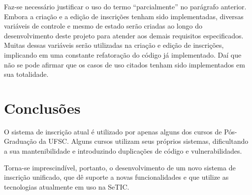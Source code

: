 \documentclass[
  10.5pt,				  %
	openright,			%
	twoside,			  %
  a5paper,
  chapter=TITLE,	%
	section=TITLE,	%
  hyphens,        %
	english,        %
	brazil          %
]{abntex2}
\begin{document}
\begin{table}[!htb]
\end{table}

Faz-se necessário justificar o uso do termo ``parcialmente'' no parágrafo anterior. Embora a criação e a edição de inscrições tenham sido implementadas, diversas variáveis de controle e mesmo de estado serão criadas ao longo do desenvolvimento deste projeto para atender aos demais requisitos especificados. Muitas dessas variáveis serão utilizadas na criação e edição de inscrições, implicando em uma constante refatoração do código já implementado. Daí que não se pode afirmar que os casos de uso citados tenham sido implementados em sua totalidade.




\chapter{Conclusões}

O sistema de inscrição atual é utilizado por apenas alguns dos cursos de Pós-Graduação da UFSC. Alguns cursos utilizam seus próprios sistemas, dificultando a sua mantenibilidade e introduzindo duplicações de código e vulnerabilidades.

Torna-se imprescindível, portanto, o desenvolvimento de um novo sistema de inscrição unificado, que dê suporte a novas funcionalidades e que utilize as tecnologias atualmente em uso na SeTIC.
\end{document}
